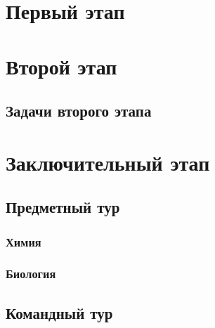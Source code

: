 \documentclass[a4paper,12pt,oneside]{book}
\begin{document}

\setcounter{tocdepth}{1}

\tableofcontents

\part{Первый этап}
\clearpage




\part{Второй этап}
\clearpage 
\chapter{Задачи второго этапа}



\part{Заключительный этап}

\clearpage
\chapter{Предметный тур}

\section{Химия}


\section{Биология}


\chapter{Командный тур}

\end{document}
